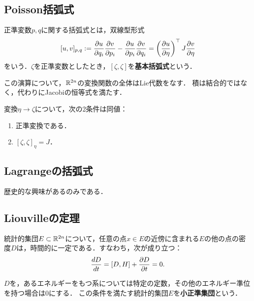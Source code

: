\documentclass[uplatex, dvipdfmx]{jsreport}
\begin{document}
\subsection{Poisson括弧式}

\begin{definition}
    正準変数$p,q$に関する括弧式とは，双線型形式
    \[[u,v]_{p,q}:=\frac{\partial u}{\partial q_i}\frac{\partial v}{\partial p_i}-\frac{\partial u}{\partial p_i}\frac{\partial v}{\partial q_i}=\left(\frac{\partial u}{\partial \eta}\right)^\top J\frac{\partial v}{\partial \eta}\]
    をいう．$\zeta$を正準変数としたとき，$[\zeta,\zeta]$を\textbf{基本括弧式}という．
\end{definition}

\begin{lemma}
    この演算について，$\mathbb{R}^{2n}$の変換関数の全体はLie代数をなす．
    積は結合的ではなく，代わりにJacobiの恒等式を満たす．
\end{lemma}

\begin{proposition}
    変換$\eta\to\zeta$について，次の2条件は同値：
    \begin{enumerate}
        \item 正準変換である．
        \item $[\zeta,\zeta]_\eta=J$．
    \end{enumerate}
\end{proposition}

\subsection{Lagrangeの括弧式}

歴史的な興味があるのみである．

\subsection{Liouvilleの定理}

\begin{theorem}
    統計的集団$E\subset\mathbb{R}^{2n}$について，任意の点$x\in E$の近傍に含まれる$E$の他の点の密度$D$は，時間的に一定である．すなわち，次が成り立つ：
    \[\frac{d D}{d t}=[D,H]+\frac{\partial D}{\partial t}=0.\]
\end{theorem}

\begin{definition}
    $D$を，あるエネルギーをもつ系については特定の定数，その他のエネルギー準位を持つ場合は$0$にする．
    この条件を満たす統計的集団$E$を\textbf{小正準集団}という．
\end{definition}
\end{document}
